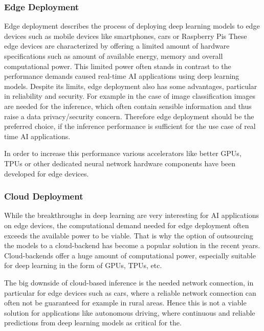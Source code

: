 \subsubsection{Edge Deployment}
Edge deployment describes the process of deploying deep learning models to edge devices such as mobile devices like smartphones, cars or Raspberry Pis
These edge devices are characterized by offering a limited amount of hardware specifications such as amount of available energy, memory and overall computational power.
This limited power often stands in contrast to the performance demands caused real-time AI applications using deep learning models.
Despite its limits, edge deployment also has some advantages, particular in reliability and security. 
For example in the case of image classification images are needed for the inference, which often contain sensible information and thus raise a data privacy/security concern.
Therefore edge deployment should be the preferred choice, if the inference performance is sufficient for the use case of real time AI applications.

In order to increase this performance various accelerators like better GPUs, TPUs or other dedicated neural network hardware components have been developed for edge devices.



\subsubsection{Cloud Deployment}
While the breakthroughs in deep learning are very interesting for AI applications on edge devices, the computational demand needed for edge deployment often exceeds the available power to be viable.
That is why the option of outsourcing the models to a cloud-backend has become a popular solution in the recent years.
Cloud-backends offer a huge amount of computational power, especially suitable for deep learning in the form of GPUs, TPUs, etc.


The big downside of cloud-based inference is the needed network connection, in particular for edge devices such as cars, where a reliable network connection can often not be guaranteed for example in rural areas. Hence this is not a viable solution for applications like autonomous driving, where continuous and reliable predictions from deep learning models as critical for the.

